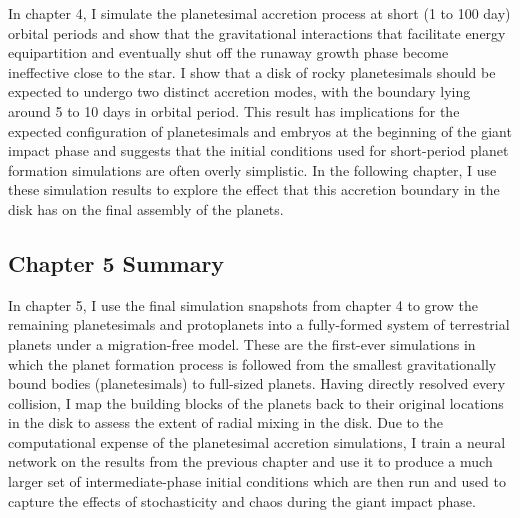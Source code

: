 In chapter 4, I simulate the planetesimal accretion process at short (1 to 100 day) orbital periods and show that the gravitational interactions that facilitate energy equipartition and eventually shut off the runaway growth phase become ineffective close to the star. I show that a disk of rocky planetesimals should be expected to undergo two distinct accretion modes, with the boundary lying around 5 to 10 days in orbital period. This result has implications for the expected configuration of planetesimals and embryos at the beginning of the giant impact phase and suggests that the initial conditions used for short-period planet formation simulations are often overly simplistic. In the following chapter, I use these simulation results to explore the effect that this accretion boundary in the disk has on the final assembly of the planets.

\subsection{Chapter 5 Summary}

In chapter 5, I use the final simulation snapshots from chapter 4 to grow the remaining planetesimals and protoplanets into a fully-formed system of terrestrial planets under a migration-free model. These are the first-ever simulations in which the planet formation process is followed from the smallest gravitationally bound bodies (planetesimals) to full-sized planets. Having directly resolved every collision, I map the building blocks of the planets back to their original locations in the disk to assess the extent of radial mixing in the disk. Due to the computational expense of the planetesimal accretion simulations, I train a neural network on the results from the previous chapter and use it to produce a much larger set of intermediate-phase initial conditions which are then run and used to capture the effects of stochasticity and chaos during the giant impact phase.
